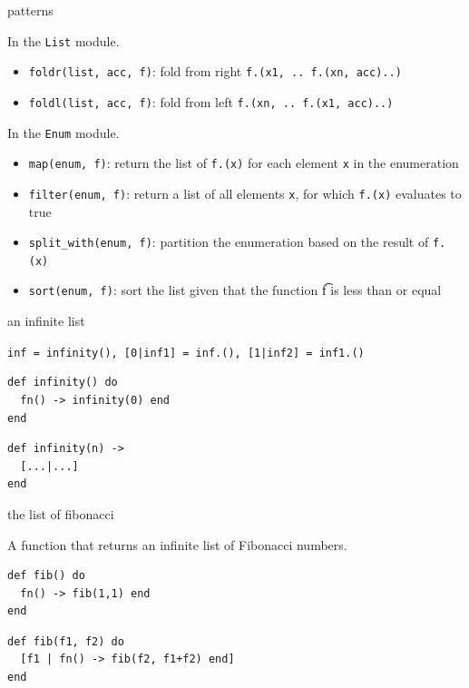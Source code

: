\begin{frame}{patterns}

In the {\tt List} module. 

\begin{itemize}
\item {\tt foldr(list, acc, f)}: fold from right  {\tt f.(x1, .. f.(xn, acc)..) }
\item {\tt foldl(list, acc, f)}: fold from left  {\tt f.(xn, .. f.(x1, acc)..) }
\end{itemize}

\vspace{10pt}\pause
In the {\tt Enum} module. 
\begin{itemize}
\item {\tt map(enum, f)}: return the list of {\tt f.(x)} for each element {\tt x} in the enumeration
\pause 
\item {\tt filter(enum, f)}: return a list of all elements {\tt x}, for which {\tt f.(x)} evaluates to true
\pause
\item {\tt split_with(enum, f)}: partition the enumeration based on the result of  {\tt f.(x)}
\pause
\item {\tt sort(enum, f)}: sort the list given that the function {\t f} is less than or equal
\end{itemize}

\end{frame}


\begin{frame}[fragile]{an infinite list}

\pause\vspace{20pt}

\verb+inf = infinity()+\pause \verb+, [0|inf1] = inf.()+\pause \verb+, [1|inf2] = inf1.()+

\pause
\begin{verbatim}
def infinity() do 
  fn() -> infinity(0) end 
end
\end{verbatim}
\pause
\begin{verbatim}
def infinity(n) -> 
  [...|...] 
end
\end{verbatim}

\end{frame}


\begin{frame}[fragile]{the list of fibonacci }

A function that returns an infinite list of Fibonacci numbers.

\pause\vspace{20pt}

\begin{verbatim}
def fib() do 
  fn() -> fib(1,1) end 
end
\end{verbatim}
\pause
\begin{verbatim}
def fib(f1, f2) do
  [f1 | fn() -> fib(f2, f1+f2) end]
end
\end{verbatim}

\end{frame}

